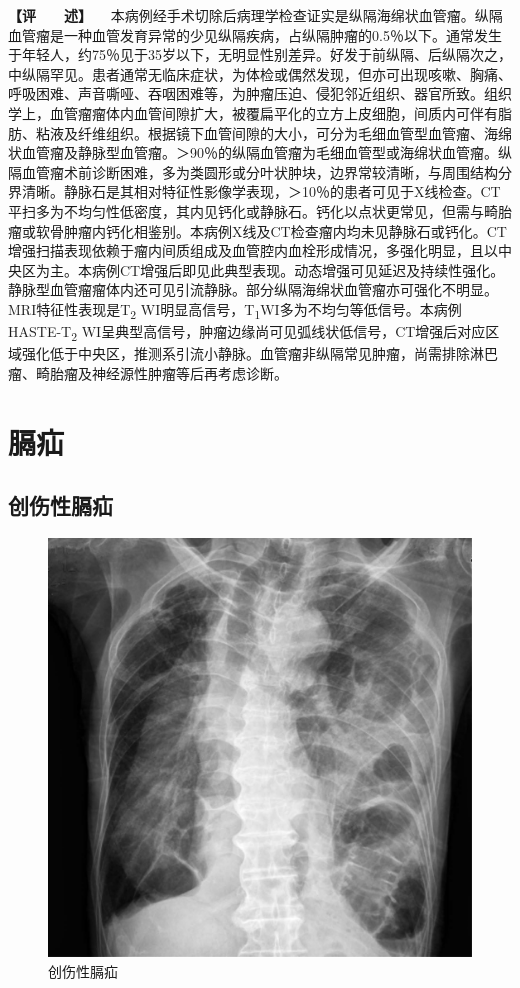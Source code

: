 \textbf{【评　　述】}
　本病例经手术切除后病理学检查证实是纵隔海绵状血管瘤。纵隔血管瘤是一种血管发育异常的少见纵隔疾病，占纵隔肿瘤的0.5％以下。通常发生于年轻人，约75％见于35岁以下，无明显性别差异。好发于前纵隔、后纵隔次之，中纵隔罕见。患者通常无临床症状，为体检或偶然发现，但亦可出现咳嗽、胸痛、呼吸困难、声音嘶哑、吞咽困难等，为肿瘤压迫、侵犯邻近组织、器官所致。组织学上，血管瘤瘤体内血管间隙扩大，被覆扁平化的立方上皮细胞，间质内可伴有脂肪、粘液及纤维组织。根据镜下血管间隙的大小，可分为毛细血管型血管瘤、海绵状血管瘤及静脉型血管瘤。＞90％的纵隔血管瘤为毛细血管型或海绵状血管瘤。纵隔血管瘤术前诊断困难，多为类圆形或分叶状肿块，边界常较清晰，与周围结构分界清晰。静脉石是其相对特征性影像学表现，＞10％的患者可见于X线检查。CT平扫多为不均匀性低密度，其内见钙化或静脉石。钙化以点状更常见，但需与畸胎瘤或软骨肿瘤内钙化相鉴别。本病例X线及CT检查瘤内均未见静脉石或钙化。CT增强扫描表现依赖于瘤内间质组成及血管腔内血栓形成情况，多强化明显，且以中央区为主。本病例CT增强后即见此典型表现。动态增强可见延迟及持续性强化。静脉型血管瘤瘤体内还可见引流静脉。部分纵隔海绵状血管瘤亦可强化不明显。MRI特征性表现是T\textsubscript{2}
WI明显高信号，T\textsubscript{1}WI多为不均匀等低信号。本病例HASTE-T\textsubscript{2}
WI呈典型高信号，肿瘤边缘尚可见弧线状低信号，CT增强后对应区域强化低于中央区，推测系引流小静脉。血管瘤非纵隔常见肿瘤，尚需排除淋巴瘤、畸胎瘤及神经源性肿瘤等后再考虑诊断。

\section{膈疝}

\subsection{创伤性膈疝}

\begin{figure}[!htbp]
 \centering
 \includegraphics{./images/Image00202.jpg}
 \captionsetup{justification=centering}
 \caption{创伤性膈疝}
 \label{fig3-13-1}
  \end{figure} 

